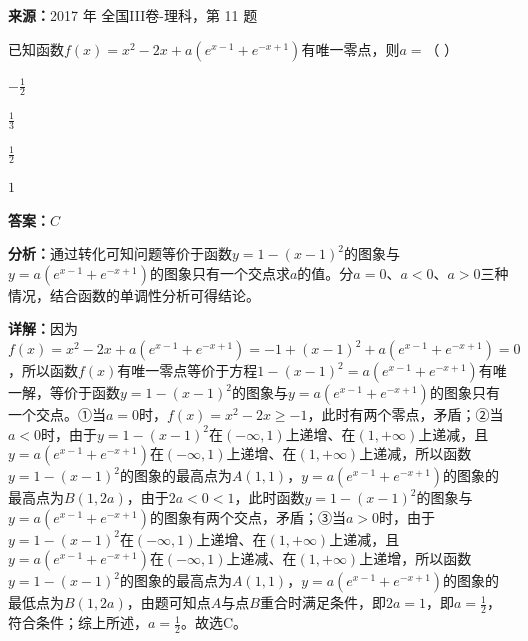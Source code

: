 \begin{question}[points=5]
\textbf{来源：}2017 年 全国III卷-理科，第 11 题\par
已知函数$f(x)=x^2-2x+a(e^{x-1}+e^{-x+1})$有唯一零点，则$a=$（ ）
\begin{choices}
  \item $-\frac{1}{2}$
  \item $\frac{1}{3}$
  \item $\frac{1}{2}$
  \item $1$
\end{choices}
\begin{solution}
\textbf{答案：}$C$

\textbf{分析：}通过转化可知问题等价于函数$y=1-(x-1)^2$的图象与$y=a(e^{x-1}+e^{-x+1})$的图象只有一个交点求$a$的值。分$a=0$、$a<0$、$a>0$三种情况，结合函数的单调性分析可得结论。

\textbf{详解：}因为$f(x)=x^2-2x+a(e^{x-1}+e^{-x+1})=-1+(x-1)^2+a(e^{x-1}+e^{-x+1})=0$，所以函数$f(x)$有唯一零点等价于方程$1-(x-1)^2=a(e^{x-1}+e^{-x+1})$有唯一解，等价于函数$y=1-(x-1)^2$的图象与$y=a(e^{x-1}+e^{-x+1})$的图象只有一个交点。①当$a=0$时，$f(x)=x^2-2x\ge -1$，此时有两个零点，矛盾；②当$a<0$时，由于$y=1-(x-1)^2$在$(-\infty,1)$上递增、在$(1,+\infty)$上递减，且$y=a(e^{x-1}+e^{-x+1})$在$(-\infty,1)$上递增、在$(1,+\infty)$上递减，所以函数$y=1-(x-1)^2$的图象的最高点为$A(1,1)$，$y=a(e^{x-1}+e^{-x+1})$的图象的最高点为$B(1,2a)$，由于$2a<0<1$，此时函数$y=1-(x-1)^2$的图象与$y=a(e^{x-1}+e^{-x+1})$的图象有两个交点，矛盾；③当$a>0$时，由于$y=1-(x-1)^2$在$(-\infty,1)$上递增、在$(1,+\infty)$上递减，且$y=a(e^{x-1}+e^{-x+1})$在$(-\infty,1)$上递减、在$(1,+\infty)$上递增，所以函数$y=1-(x-1)^2$的图象的最高点为$A(1,1)$，$y=a(e^{x-1}+e^{-x+1})$的图象的最低点为$B(1,2a)$，由题可知点$A$与点$B$重合时满足条件，即$2a=1$，即$a=\frac{1}{2}$，符合条件；综上所述，$a=\frac{1}{2}$。故选C。
\end{solution}
\end{question}

